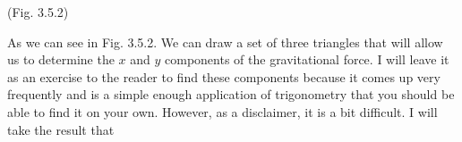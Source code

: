 \newline
\newline
\newline
{}
\begin{center} 
(Fig. 3.5.2)
\end{center}
As we can see in Fig. 3.5.2. We can draw a set of three triangles that will allow us to determine the $x$ and  $y$ components of the gravitational force. I will leave it as an exercise to the reader to find these components because it comes up very frequently and is a simple enough application of trigonometry that you should be able to find it on your own. However, as a disclaimer, it is a bit difficult. I will take the result that
